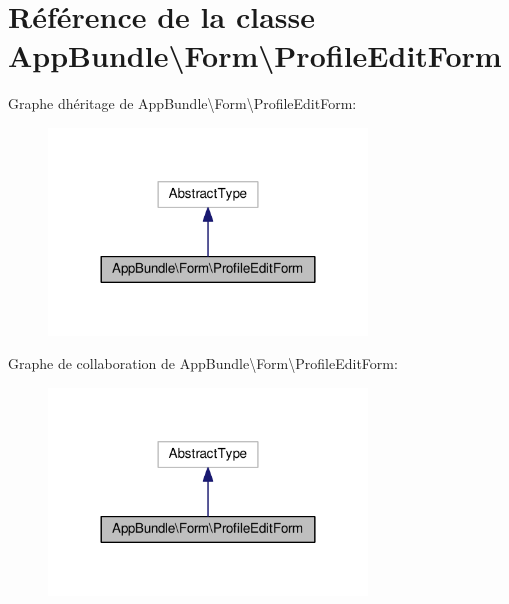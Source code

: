 \hypertarget{classAppBundle_1_1Form_1_1ProfileEditForm}{}\section{Référence de la classe App\+Bundle\textbackslash{}Form\textbackslash{}Profile\+Edit\+Form}
\label{classAppBundle_1_1Form_1_1ProfileEditForm}


Graphe d\textquotesingle{}héritage de App\+Bundle\textbackslash{}Form\textbackslash{}Profile\+Edit\+Form\+:\nopagebreak
\begin{figure}[H]
\begin{center}
\leavevmode
\includegraphics[width=240pt]{classAppBundle_1_1Form_1_1ProfileEditForm__inherit__graph}
\end{center}
\end{figure}


Graphe de collaboration de App\+Bundle\textbackslash{}Form\textbackslash{}Profile\+Edit\+Form\+:\nopagebreak
\begin{figure}[H]
\begin{center}
\leavevmode
\includegraphics[width=240pt]{classAppBundle_1_1Form_1_1ProfileEditForm__coll__graph}
\end{center}
\end{figure}
